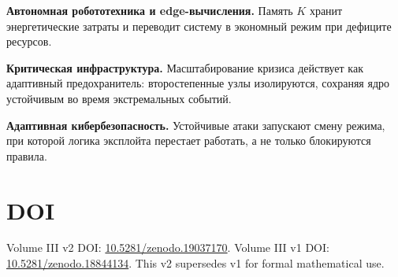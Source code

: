 ﻿\documentclass[12pt,a4paper]{article}
\begin{document}
\textbf{Автономная робототехника и edge-вычисления.} Память $K$ хранит энергетические затраты и переводит систему в экономный режим при дефиците ресурсов.

\textbf{Критическая инфраструктура.} Масштабирование кризиса действует как адаптивный предохранитель: второстепенные узлы изолируются, сохраняя ядро устойчивым во время экстремальных событий.

\textbf{Адаптивная кибербезопасность.} Устойчивые атаки запускают смену режима, при которой логика эксплойта перестает работать, а не только блокируются правила.


\section*{DOI}
Volume III v2 DOI: \href{https://doi.org/10.5281/zenodo.19037170}{10.5281/zenodo.19037170}.
Volume III v1 DOI: \href{https://doi.org/10.5281/zenodo.18844134}{10.5281/zenodo.18844134}.
This v2 supersedes v1 for formal mathematical use.
\end{document}
